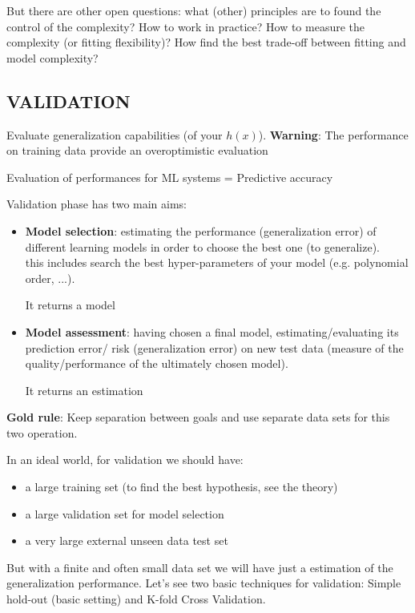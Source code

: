 \documentclass[../main.tex]{subfiles}
\begin{document}
But there are other open questions: what (other) principles are to found the control of the complexity? How to work in practice? How to measure the complexity (or fitting flexibility)? How find the best trade-off between fitting and model complexity?

\subsection{VALIDATION}
Evaluate generalization capabilities (of your $h(x)$). \textbf{Warning}: The performance on training data provide an overoptimistic evaluation
\begin{center}
    Evaluation of performances for ML systems = Predictive accuracy
\end{center}

Validation phase has two main aims:

\begin{itemize}
    \item \textbf{Model selection}: estimating the performance (generalization error) of different learning models in order to choose the best one (to generalize).\\
    this includes search the best hyper-parameters of your model (e.g. polynomial order, ...).
    \begin{center}
        It returns a model
    \end{center}
    
    \item \textbf{Model assessment}: having chosen a final model, estimating/evaluating its prediction error/ risk (generalization error) on new test data (measure of the quality/performance of the ultimately chosen model).
    \begin{center}
        It returns an estimation
    \end{center}
\end{itemize}

\noindent\textbf{Gold rule}: Keep separation between goals and use separate data sets for this two operation.

In an ideal world, for validation we should have:

\begin{itemize}
    \item a large training set (to find the best hypothesis, see the theory)

    \item a large validation set for model selection
    
    \item a very large external unseen data test set
\end{itemize}
But with a finite and often small data set we will have just a estimation of the generalization performance. Let's see two basic techniques for validation: Simple hold-out (basic setting) and K-fold Cross Validation.
\end{document}
